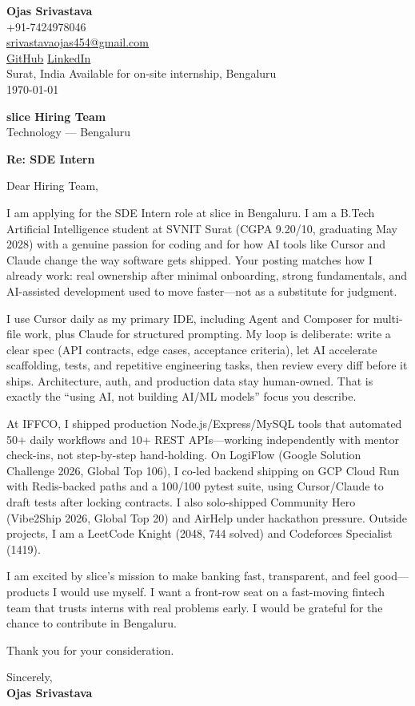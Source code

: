 \documentclass[a4paper,11pt]{article}
\begin{document}
\begin{flushright}
\textbf{Ojas Srivastava} \\
+91-7424978046 \\
\href{mailto:srivastavaojas454@gmail.com}{srivastavaojas454@gmail.com} \\
\href{https://github.com/Ojas-Srivastava05}{GitHub} \textbar{}
\href{https://linkedin.com/in/ojas-srivastava05}{LinkedIn} \\
Surat, India \textbar{} Available for on-site internship, Bengaluru \\
\today
\end{flushright}

\vspace{4mm}
\textbf{slice Hiring Team} \\
Technology --- Bengaluru

\vspace{2mm}
\textbf{Re: SDE Intern}

Dear Hiring Team,

I am applying for the SDE Intern role at slice in Bengaluru. I am a B.Tech Artificial Intelligence student at SVNIT Surat (CGPA 9.20/10, graduating May 2028) with a genuine passion for coding and for how AI tools like Cursor and Claude change the way software gets shipped. Your posting matches how I already work: real ownership after minimal onboarding, strong fundamentals, and AI-assisted development used to move faster---not as a substitute for judgment.

I use Cursor daily as my primary IDE, including Agent and Composer for multi-file work, plus Claude for structured prompting. My loop is deliberate: write a clear spec (API contracts, edge cases, acceptance criteria), let AI accelerate scaffolding, tests, and repetitive engineering tasks, then review every diff before it ships. Architecture, auth, and production data stay human-owned. That is exactly the ``using AI, not building AI/ML models'' focus you describe.

At IFFCO, I shipped production Node.js/Express/MySQL tools that automated 50+ daily workflows and 10+ REST APIs---working independently with mentor check-ins, not step-by-step hand-holding. On LogiFlow (Google Solution Challenge 2026, Global Top 106), I co-led backend shipping on GCP Cloud Run with Redis-backed paths and a 100/100 pytest suite, using Cursor/Claude to draft tests after locking contracts. I also solo-shipped Community Hero (Vibe2Ship 2026, Global Top 20) and AirHelp under hackathon pressure. Outside projects, I am a LeetCode Knight (2048, 744 solved) and Codeforces Specialist (1419).

I am excited by slice's mission to make banking fast, transparent, and feel good---products I would use myself. I want a front-row seat on a fast-moving fintech team that trusts interns with real problems early. I would be grateful for the chance to contribute in Bengaluru.

Thank you for your consideration.

Sincerely, \\
\vspace{8mm}
\textbf{Ojas Srivastava}
\end{document}
